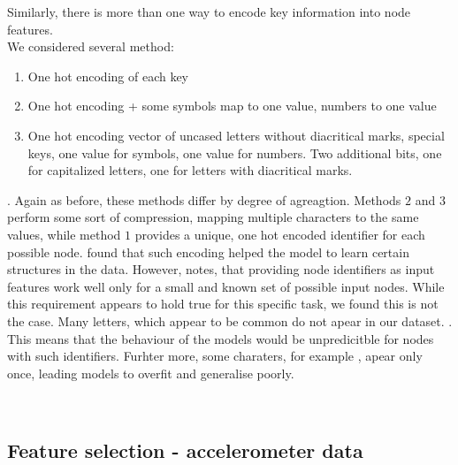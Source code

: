 Similarly, there is more than one way to encode key information into node features.\\
We considered several method:
\begin{enumerate}
	\item One hot encoding of each key 
	\item One hot encoding + some symbols map to one value, numbers to one value
	\item One hot encoding vector of uncased letters without diacritical marks, special keys, one  value for symbols, one value for numbers. Two additional bits, one for capitalized letters, one for letters with diacritical marks.
\end{enumerate}

.
Again as before, these methods differ by degree of agreagtion. Methods $2$ and $3$ perform some sort of compression, mapping multiple characters to the same values, while method $1$ provides a unique, one hot encoded identifier for each possible node.  found that such encoding helped the model to learn certain structures in the data. However,  notes, that providing node identifiers as input features work well only for a small and known set of possible input nodes. While this requirement appears to hold true for this specific task, we found this is not the case. Many letters, which appear to be common do not apear in our dataset. . This means that the behaviour of the models would be unpredicitble for nodes with such identifiers.
Furhter more, some charaters, for example , apear only once, leading models to overfit and generalise poorly.

\\



\subsection{Feature selection - accelerometer data}